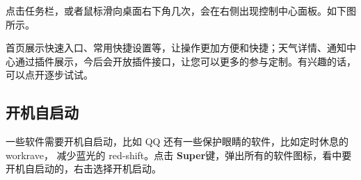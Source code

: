 \documentclass[doctor,openright,twoside]{sjtuthesis}
\theoremstyle{plain}
\theoremstyle{definition}
\theoremstyle{remark}
\theoremstyle{ocrenumbox}
\theoremstyle{plain}
\begin{document}
点击任务栏，或者鼠标滑向桌面右下角几次，会在右侧出现控制中心面板。如下图所示。


首页展示快速入口、常用快捷设置等，让操作更加方便和快捷；天气详情、通知中心通过插件展示，今后会开放插件接口，让您可以更多的参与定制。有兴趣的话，可以点开逐步试试。

\hypertarget{section-24}{%
\subsection{开机自启动}\label{section-24}}

一些软件需要开机自启动，比如 QQ 还有一些保护眼睛的软件，比如定时休息的 workrave， 减少蓝光的 red-shift。点击 \textbf{Super}键，弹出所有的软件图标，看中要开机自启动的，右击选择开机启动。

\end{document}

